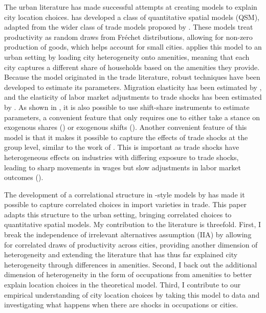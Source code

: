 \documentclass[10pt]{article}
\begin{document}
The urban literature has made successful attempts at creating models to explain city location choices. \cite{redding2017} has developed a class of quantitative spatial models (QSM), adapted from the wider class of trade models proposed by \cite{ek}. These models treat productivity as random draws from Fréchet distributions, allowing for non-zero production of goods, which helps account for small cities. \cite{redding} applies this model to an urban setting by loading city heterogeneity onto amenities, meaning that each city captures a different share of households based on the amenities they provide. Because the model originated in the trade literature, robust techniques have been developed to estimate its parameters. Migration elasticity has been estimated by \cite{albert_monras2022}, and the elasticity of labor market adjustments to trade shocks has been estimated by \cite{kim_vogel2020}. As shown in \cite{adh2013}, it is also possible to use \cite{bartik1991} shift-share instruments to estimate parameters, a convenient feature that only requires one to either take a stance on exogenous shares (\cite{pssh2020}) or exogenous shifts (\cite{bhj2020}). Another convenient feature of this model is that it makes it possible to capture the effects of trade shocks at the group level, similar to the work of \cite{galle2023}. This is important as trade shocks have heterogeneous effects on industries with differing exposure to trade shocks, leading to sharp movements in wages but slow adjustments in labor market outcomes (\cite{acm2010}).

The development of a correlational structure in \cite{ek}-style models by \cite{lindandramondo} has made it possible to capture correlated choices in import varieties in trade. This paper adapts this structure to the urban setting, bringing correlated choices to quantitative spatial models. My contribution to the literature is threefold. First, I break the independence of irrelevant alternatives assumption (IIA) by allowing for correlated draws of productivity across cities, providing another dimension of heterogeneity and extending the literature that has thus far explained city heterogeneity through differences in amenities. Second, I back out the additional dimension of heterogeneity in the form of occupations from amenities to better explain location choices in the theoretical model. Third, I contribute to our empirical understanding of city location choices by taking this model to data and investigating what happens when there are shocks in occupations or cities.
\end{document}
